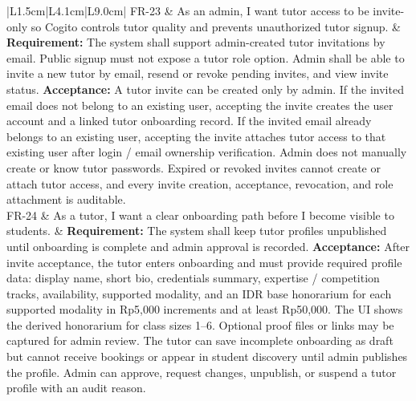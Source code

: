 \documentclass[11pt,a4paper]{article}
\begin{document}
\begin{longtable}{|L{1.5cm}|L{4.1cm}|L{9.0cm}|}
	\hline
	FR-23           & As an admin, I want tutor access to be invite-only so Cogito controls tutor quality and prevents unauthorized tutor signup.                         & \textbf{Requirement:} The system shall support admin-created tutor invitations by email. Public signup must not expose a tutor role option. Admin shall be able to invite a new tutor by email, resend or revoke pending invites, and view invite status. \newline \textbf{Acceptance:} A tutor invite can be created only by admin. If the invited email does not belong to an existing user, accepting the invite creates the user account and a linked tutor onboarding record. If the invited email already belongs to an existing user, accepting the invite attaches tutor access to that existing user after login / email ownership verification. Admin does not manually create or know tutor passwords. Expired or revoked invites cannot create or attach tutor access, and every invite creation, acceptance, revocation, and role attachment is auditable.                                                                                                                                                                                        \\
	\hline
	FR-24           & As a tutor, I want a clear onboarding path before I become visible to students.                         & \textbf{Requirement:} The system shall keep tutor profiles unpublished until onboarding is complete and admin approval is recorded. \newline \textbf{Acceptance:} After invite acceptance, the tutor enters onboarding and must provide required profile data: display name, short bio, credentials summary, expertise / competition tracks, availability, supported modality, and an IDR base honorarium for each supported modality in Rp5,000 increments and at least Rp50,000. The UI shows the derived honorarium for class sizes 1--6. Optional proof files or links may be captured for admin review. The tutor can save incomplete onboarding as draft but cannot receive bookings or appear in student discovery until admin publishes the profile. Admin can approve, request changes, unpublish, or suspend a tutor profile with an audit reason.                                                                                                                                                                                        \\
	\hline
\end{longtable}
\normalsize
\end{document}
